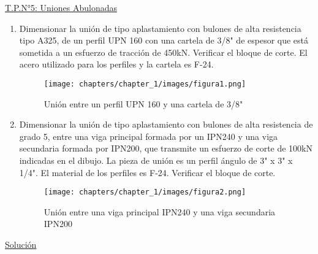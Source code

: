 \begin{center}
\underline{\Large{T.P.N°5: Uniones Abulonadas}}
\end{center}

\begin{enumerate}
\item Dimensionar la unión de tipo aplastamiento con bulones de alta resistencia tipo A325, de un
perfil UPN 160 con una cartela de 3/8" de espesor que está sometida a un esfuerzo de
tracción de 450kN. Verificar el bloque de corte. El acero utilizado para los perfiles y la
cartela es F-24.
\begin{figure}[H]
\begin{center}
     \texttt{[image: chapters/chapter\_1/images/figura1.png]}
\end{center}
\caption{Unión entre un perfil UPN 160 y una cartela de 3/8"}
\end{figure}
\item Dimensionar la unión de tipo aplastamiento con bulones de alta resistencia de grado 5, entre
una viga principal formada por un IPN240 y una viga secundaria formada por IPN200, que
transmite un esfuerzo de corte de 100kN indicadas en el dibujo. La pieza de unión es un
perfil ángulo de 3" x 3" x 1/4". El material de los perfiles es F-24. Verificar el bloque de
corte.
\begin{figure}[H]
\begin{center}
     \texttt{[image: chapters/chapter\_1/images/figura2.png]}
\end{center}
\caption{Unión entre una viga principal IPN240 y una viga secundaria IPN200}
\end{figure}
\end{enumerate}

\newpage

\begin{center}
\underline{\Large{Solución}}
\end{center}

